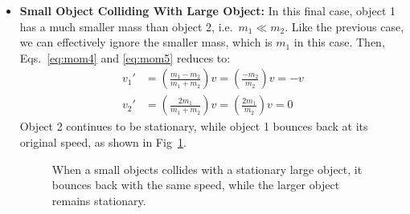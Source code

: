 \begin{itemize}[itemsep=6pt]
\begin{figure}[ht]
    \caption{When a large object collides with a stationary small object, 
    it does not slow down, but the smaller object gains twice the speed.}
    \label{fig:big-small}
  \end{figure}
\item\textbf{Small Object Colliding With Large Object:} In this final case,
  object 1 has a much smaller mass than object 2, i.e.\ $m_1\ll m_2$. Like the
  previous case, we can effectively ignore the smaller mass, which is $m_1$ in
  this case. Then, Eqs.~\ref{eq:mom4} and \ref{eq:mom5} reduces to:
  \begin{align*}
    v_1'&=\left(\frac{m_1-m_2}{m_1+m_2}\right)v=\left(\frac{-m_2}{m_2}\right)v
    =-v\\
    v_2'&=\left(\frac{2m_1}{m_1+m_2}\right)v=\left(\frac{2m_1}{m_2}\right)v=0
  \end{align*}
  Object 2 continues to be stationary, while object 1 bounces back at its
  original speed, as shown in Fig~\ref{fig:big-small}.
  \begin{figure}[ht]
    \centering
    \begin{subfigure}{.45\textwidth}
      \centering
    \end{subfigure}
    \begin{subfigure}{.45\textwidth}
      \centering
    \end{subfigure}
    \caption{When a small objects collides with a stationary large object, it
      bounces back with the same speed, while the larger object remains
      stationary.}
  \end{figure}
\end{itemize}




